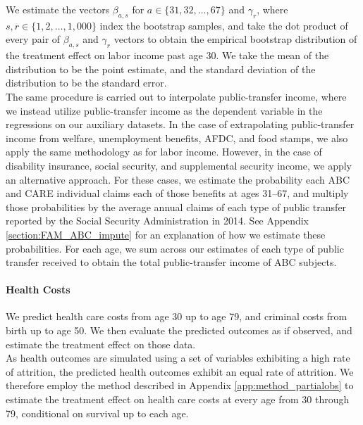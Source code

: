 \noindent We estimate the vectors $\beta_{a, s}$ for $a \in \{31, 32, \dots, 67\}$ and $\gamma_r$, where
$s,r \in \{1,2,\dots,1,000\}$ index the bootstrap samples, and take the dot product of every pair of
$\beta_{a,s}$ and $\gamma_r$ vectors to obtain the empirical bootstrap distribution of the treatment
effect on labor income past age 30. We take the mean of the distribution to be the point estimate,
and the standard deviation of the distribution to be the standard error. \\


\noindent The same procedure is carried out to interpolate public-transfer income, where we instead utilize public-transfer
income as the dependent variable in the regressions on our auxiliary datasets. In the case of
extrapolating public-transfer income from welfare, unemployment benefits, AFDC, and food stamps, we also apply
the same methodology as for labor income. However, in the case of disability insurance, social
security, and supplemental security income, we apply an alternative approach. For these cases, we estimate
the probability each ABC and CARE individual claims each of those benefits at ages 31--67, and multiply those
probabilities by the average annual claims of each type of public transfer reported by the Social
Security Administration in 2014. See Appendix \ref{section:FAM_ABC_impute}
for an explanation of how we estimate these probabilities. For each age, we sum across our estimates of
each type of public transfer received to obtain the total public-transfer income of ABC subjects. \\


\paragraph{Health Costs}

\noindent We predict health care costs from age 30 up to age 79, and criminal costs from birth
up to age 50. We then evaluate the predicted outcomes as if observed, and estimate the
treatment effect on those data.\\

\noindent As health outcomes are simulated using a set of variables exhibiting a high rate of attrition, the
predicted health outcomes exhibit an equal rate of attrition. We therefore employ the method described
in Appendix \ref{app:method_partialobs} to estimate the treatment effect on health care costs at
every age from 30 through 79, conditional on survival up to each age. \\

